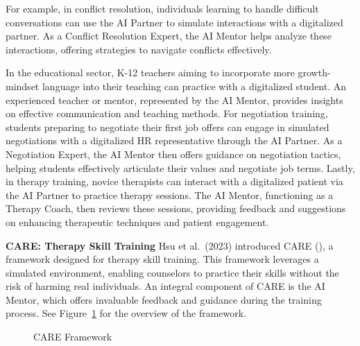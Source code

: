 \documentclass[
  letterpaper,
  numbers=noenddot,
  DIV=11]{scrreprt}
\theoremstyle{definition}
\theoremstyle{plain}
\theoremstyle{plain}
\theoremstyle{remark}
\begin{document}
For example, in conflict resolution, individuals learning to handle
difficult conversations can use the AI Partner to simulate interactions
with a digitalized partner. As a Conflict Resolution Expert, the AI
Mentor helps analyze these interactions, offering strategies to navigate
conflicts effectively.

In the educational sector, K-12 teachers aiming to incorporate more
growth-mindset language into their teaching can practice with a
digitalized student. An experienced teacher or mentor, represented by
the AI Mentor, provides insights on effective communication and teaching
methods. For negotiation training, students preparing to negotiate their
first job offers can engage in simulated negotiations with a digitalized
HR representative through the AI Partner. As a Negotiation Expert, the
AI Mentor then offers guidance on negotiation tactics, helping students
effectively articulate their values and negotiate job terms. Lastly, in
therapy training, novice therapists can interact with a digitalized
patient via the AI Partner to practice therapy sessions. The AI Mentor,
functioning as a Therapy Coach, then reviews these sessions, providing
feedback and suggestions on enhancing therapeutic techniques and patient
engagement.

\textbf{CARE: Therapy Skill Training} Hsu et al.~(2023) introduced CARE
(), a framework designed
for therapy skill training. This framework leverages a simulated
environment, enabling counselors to practice their skills without the
risk of harming real individuals. An integral component of CARE is the
AI Mentor, which offers invaluable feedback and guidance during the
training process. See Figure~\ref{fig-care} for the overview of the
framework.

\begin{figure}


\caption{\label{fig-care}CARE Framework}

\end{figure}%
\end{document}

